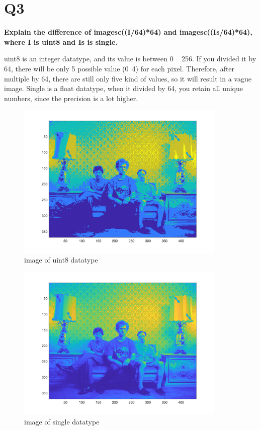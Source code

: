 \documentclass[oneside,a4paper]{article}
\begin{document}
\section*{Q3}
\textbf{Explain the difference of imagesc((I/64)*64) and imagesc((Is/64)*64), where I is uint8
and Is is single.}

uint8 is an integer datatype, and its value is between 0 ~ 256. If you divided it by 64, there will be only 5 possible value (0~4) for each pixel. Therefore, after multiple by 64, there are still only five kind of values, so it will result in a vague image. Single is a float datatype, when it divided by 64, you retain all unique numbers, since the precision is a lot higher.
\newline
\newline
\newline
\begin{figure}[ht!]
\centering
\includegraphics[width=100mm]{figures/Q3_img_uint8.png}
\caption{image of uint8 datatype}
\label{fig:Q3a}
\end{figure}

\begin{figure}[ht!]
\centering
\includegraphics[width=100mm]{figures/Q3_img_single.png}
\caption{image of single datatype}
\label{fig:Q3b}
\end{figure}
\end{document}
